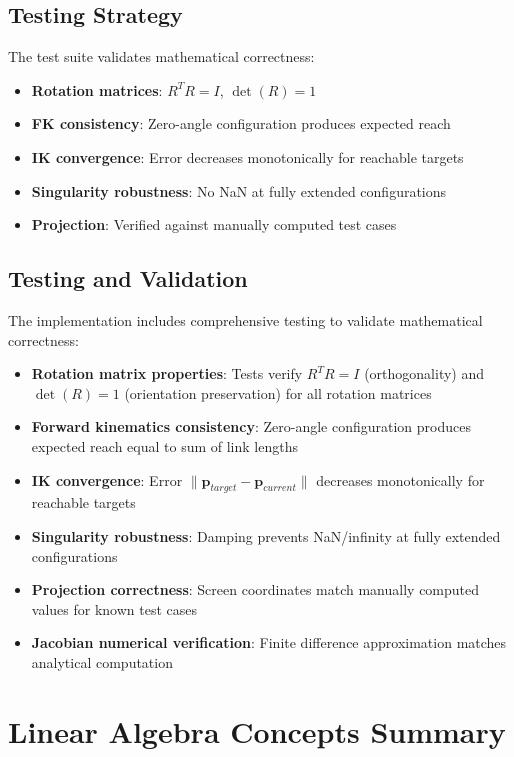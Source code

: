\documentclass[11pt]{article}
\begin{document}
\subsection{Testing Strategy}

The test suite validates mathematical correctness:
\begin{itemize}[nosep]
    \item \textbf{Rotation matrices}: $R^T R = I$, $\det(R) = 1$
    \item \textbf{FK consistency}: Zero-angle configuration produces expected reach
    \item \textbf{IK convergence}: Error decreases monotonically for reachable targets
    \item \textbf{Singularity robustness}: No NaN at fully extended configurations
    \item \textbf{Projection}: Verified against manually computed test cases
\end{itemize}

\subsection{Testing and Validation}

The implementation includes comprehensive testing to validate mathematical correctness:

\begin{itemize}[nosep]
    \item \textbf{Rotation matrix properties}: Tests verify $R^T R = I$ (orthogonality) and $\det(R) = 1$ (orientation preservation) for all rotation matrices
    \item \textbf{Forward kinematics consistency}: Zero-angle configuration produces expected reach equal to sum of link lengths
    \item \textbf{IK convergence}: Error $\|\mathbf{p}_{target} - \mathbf{p}_{current}\|$ decreases monotonically for reachable targets
    \item \textbf{Singularity robustness}: Damping prevents NaN/infinity at fully extended configurations
    \item \textbf{Projection correctness}: Screen coordinates match manually computed values for known test cases
    \item \textbf{Jacobian numerical verification}: Finite difference approximation matches analytical computation
\end{itemize}

\section{Linear Algebra Concepts Summary}
\end{document}
